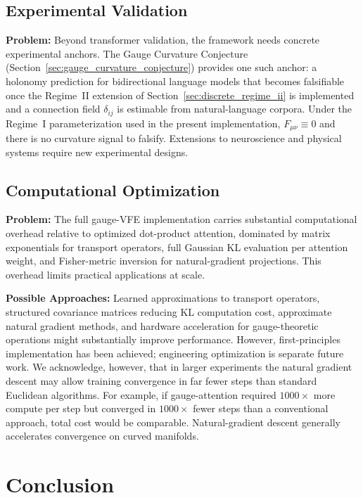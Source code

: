 \documentclass[11pt]{article}
\begin{document}
\subsection{Experimental Validation}

\textbf{Problem:} Beyond transformer validation, the framework needs concrete experimental anchors. The Gauge Curvature Conjecture (Section~\ref{sec:gauge_curvature_conjecture}) provides one such anchor: a holonomy prediction for bidirectional language models that becomes falsifiable once the Regime~II extension of Section~\ref{sec:discrete_regime_ii} is implemented and a connection field $\delta_{ij}$ is estimable from natural-language corpora. Under the Regime~I parameterization used in the present implementation, $F_{\mu\nu} \equiv 0$ and there is no curvature signal to falsify. Extensions to neuroscience and physical systems require new experimental designs.

\subsection{Computational Optimization}

\textbf{Problem:} The full gauge-VFE implementation carries substantial computational overhead relative to optimized dot-product attention, dominated by matrix exponentials for transport operators, full Gaussian KL evaluation per attention weight, and Fisher-metric inversion for natural-gradient projections. This overhead limits practical applications at scale.

\textbf{Possible Approaches:} Learned approximations to transport operators, structured covariance matrices reducing KL computation cost, approximate natural gradient methods, and hardware acceleration for gauge-theoretic operations might substantially improve performance. However, first-principles implementation has been achieved; engineering optimization is separate future work. We acknowledge, however, that in larger experiments the natural gradient descent may allow training convergence in far fewer steps than standard Euclidean algorithms.  For example, if gauge-attention required $1000\times$ more compute per step but converged in $1000\times$ fewer steps than a conventional approach, total cost would be comparable. Natural-gradient descent generally accelerates convergence on curved manifolds.

\section{Conclusion}
\label{sec:conclusion}
\end{document}
